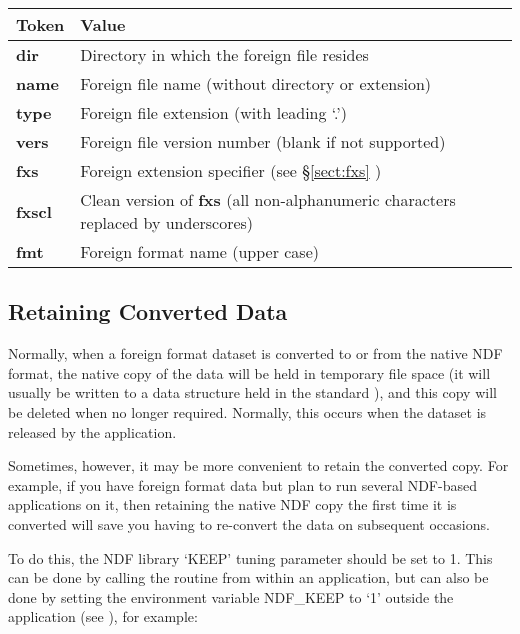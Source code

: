 \documentclass[11pt,twoside,nolof]{starlink}
\begin{document}
\begin{center}
\begin{tabular}{|l|l|}
\hline
\textbf{Token} & \textbf{Value}\\
\hline\hline
\textbf{dir}  & Directory in which the foreign file resides\\
\textbf{name} & Foreign file name (without directory or extension)\\
\textbf{type} & Foreign file extension (with leading `.')\\
\textbf{vers} & Foreign file version number (blank if not supported)\\
\textbf{fxs}  & Foreign extension specifier (see \S\ref{sect:fxs} )\\
\textbf{fxscl} & Clean version of \textbf{fxs} (all non-alphanumeric characters
replaced by underscores)\\
\textbf{fmt}  & Foreign format name (upper case)\\
\hline
\end{tabular}
\end{center}

\subsection{\label{sect:keep}Retaining Converted Data}

Normally, when a foreign format dataset is converted to or from the
native NDF format, the native copy of the data will be held in
temporary file space (it will usually be written to a data structure
held in the standard  ), and this copy will be deleted when no
longer required. Normally, this occurs when the dataset is released by
the application.

Sometimes, however, it may be more convenient to retain the converted
copy. For example, if you have foreign format data but plan to run
several NDF-based applications on it, then retaining the native NDF
copy the first time it is converted will save you having to re-convert
the data on subsequent occasions.

To do this, the NDF library `KEEP' tuning parameter should be set to
1. This can be done by calling the 
routine from within an application, but can also be done by setting
the environment variable NDF\_KEEP to `1' outside the application (see
), for example:
\end{document}
